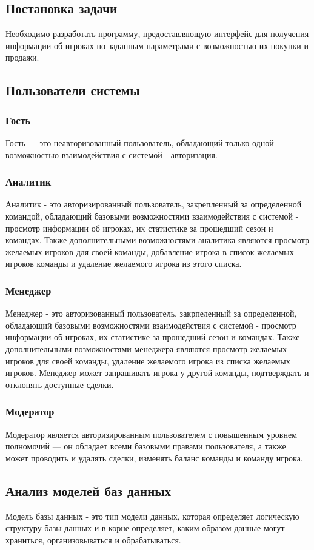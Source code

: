 \subsection{Постановка задачи}
Необходимо разработать программу, предоставляющую интерфейс для получения информации об игроках по заданным параметрами с возможностью их покупки и продажи.
\subsection{Пользователи системы}
\subsubsection{Гость}
Гость — это неавторизованный пользователь, обладающий только одной возможностью взаимодействия с системой - авторизация.
\subsubsection{Аналитик}
Аналитик - это авторизированный пользователь, закрепленный за определенной командой, обладающий базовыми возможностями взаимодействия с системой - просмотр информации об игроках, их статистике за прошедший сезон и командах. Также дополнительными возможностями аналитика являются просмотр желаемых игроков для своей команды, добавление игрока в список желаемых игроков команды и удаление желаемого игрока из этого списка.
\subsubsection{Менеджер} 
Менеджер - это авторизованный пользователь, закрпеленный за определенной, обладающий базовыми возможностями взаимодействия с системой - просмотр информации об игроках, их статистике за прошедший сезон и командах. Также дополнительными возможностями менеджера являются просмотр желаемых игроков для своей команды, удаление желаемого игрока из списка желаемых игроков. Менеджер может запрашивать игрока у другой команды, подтверждать и отклонять доступные сделки.
\subsubsection{Модератор}
Модератор является авторизированным пользователем с повышенным уровнем полномочий — он обладает всеми базовыми правами пользователя, а также может проводить и удалять сделки, изменять баланс команды и команду игрока.
\subsection{Анализ моделей баз данных}
Модель базы данных - это тип модели данных, которая определяет логическую структуру базы данных и в корне определяет, каким образом данные могут храниться, организовываться и обрабатываться.

